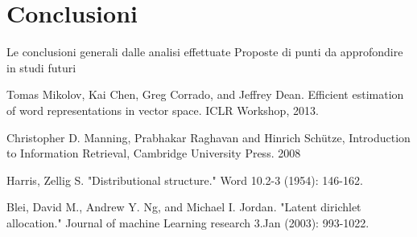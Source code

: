 \documentclass[
	12pt, %
	a4paper, %
	oneside, %
	headinclude,footinclude, %
	BCOR5mm, %
]{scrartcl}
\begin{document}
\section{Conclusioni}
	Le conclusioni generali dalle analisi effettuate
	Proposte di punti da approfondire in studi futuri


\begin{thebibliography}{12}

    Tomas Mikolov, Kai Chen, Greg Corrado, and Jeffrey Dean. Efficient estimation of word representations
    in vector space. ICLR Workshop, 2013.

	Christopher D. Manning, Prabhakar Raghavan and Hinrich Schütze, Introduction to Information Retrieval, Cambridge University Press. 2008

	Harris, Zellig S. "Distributional structure." Word 10.2-3 (1954): 146-162.

	Blei, David M., Andrew Y. Ng, and Michael I. Jordan. "Latent dirichlet allocation." Journal of machine Learning research 3.Jan (2003): 993-1022.

\end{thebibliography}

\end{document}
